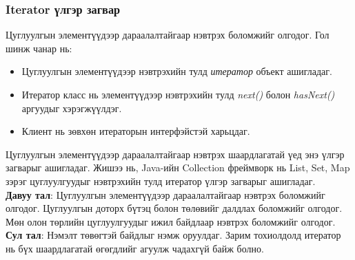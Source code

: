 
\subsubsection{Iterator үлгэр загвар}
\quad \quad Цуглуулгын элементүүдээр дараалалтайгаар нэвтрэх боломжийг олгодог. Гол шинж чанар нь:
\begin{itemize}
	\item Цуглуулгын элементүүдээр нэвтрэхийн тулд \textit{итератор} объект ашигладаг.
	\item Итератор класс нь элементүүдээр нэвтрэхийн тулд \textit{next()} болон \textit{hasNext()} аргуудыг хэрэгжүүлдэг.
	\item Клиент нь зөвхөн итераторын интерфэйстэй харьцдаг.
\end{itemize}
Цуглуулгын элементүүдээр дараалалтайгаар нэвтрэх шаардлагатай үед энэ үлгэр загварыг ашигладаг. Жишээ нь, Java-ийн Collection фреймворк нь List, Set, Map зэрэг цуглуулгуудыг нэвтрэхийн тулд итератор үлгэр загварыг ашигладаг.\\
\textbf{Давуу тал}: Цуглуулгын элементүүдээр дараалалтайгаар нэвтрэх боломжийг олгодог. Цуглуулгын доторх бүтэц болон төлөвийг далдлах боломжийг олгодог. Мөн олон төрлийн цуглуулгуудыг ижил байдлаар нэвтрэх боломжийг олгодог.\\
\textbf{Сул тал}: Нэмэлт төвөгтэй байдлыг нэмж оруулдаг. Зарим тохиолдолд итератор нь бүх шаардлагатай өгөгдлийг агуулж чадахгүй байж болно.